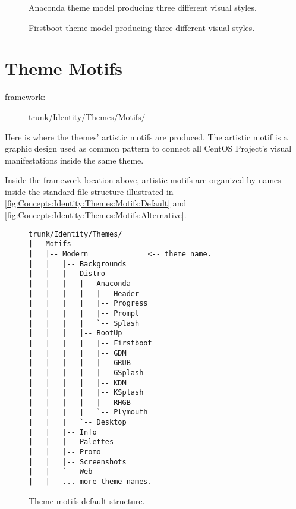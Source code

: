 \begin{figure}
\begin{center}
\end{center}
\caption{Anaconda theme model producing three different visual
styles.}
\end{figure}

\begin{figure}
\begin{center}
\end{center}
\caption{Firstboot theme model producing three different visual
styles.}
\end{figure}

\section{Theme Motifs}
\hypertarget{sec:Concepts:Identity:Themes:Motifs}{}
\label{sec:Concepts:Identity:Themes:Motifs}

\begin{description}
\item[framework:] trunk/Identity/Themes/Motifs/
\end{description}

\noindent Here is where the themes' artistic motifs are produced. The
artistic motif is a graphic design used as common pattern to connect
all CentOS Project's visual manifestations inside the same theme.

Inside the framework location above, artistic motifs are organized by
names inside the standard file structure illustrated in
\autoref{fig:Concepts:Identity:Themes:Motifs:Default} and
\autoref{fig:Concepts:Identity:Themes:Motifs:Alternative}.

\begin{figure}[!hbp]
\hrulefill
\begin{verbatim}
trunk/Identity/Themes/
|-- Motifs
|   |-- Modern              <-- theme name.
|   |   |-- Backgrounds
|   |   |-- Distro
|   |   |   |-- Anaconda
|   |   |   |   |-- Header
|   |   |   |   |-- Progress
|   |   |   |   |-- Prompt
|   |   |   |   `-- Splash
|   |   |   |-- BootUp
|   |   |   |   |-- Firstboot
|   |   |   |   |-- GDM
|   |   |   |   |-- GRUB
|   |   |   |   |-- GSplash
|   |   |   |   |-- KDM
|   |   |   |   |-- KSplash  
|   |   |   |   |-- RHGB
|   |   |   |   `-- Plymouth
|   |   |   `-- Desktop
|   |   |-- Info
|   |   |-- Palettes
|   |   |-- Promo
|   |   |-- Screenshots
|   |   `-- Web
|   |-- ... more theme names.
\end{verbatim}
\hrulefill
\caption{Theme motifs default structure.%
   \label{fig:Concepts:Identity:Themes:Motifs:Default}}
\end{figure}

